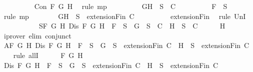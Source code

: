 \begin{isabellebody}
\ \ \ \ \ \ \ \ \isamarkupfalse%
\ {\isacartoucheopen}Con\ F\ G\ H{\isacartoucheclose}\ \isamarkupfalse%
\ {\isacharparenleft}rule\ mp{\isacharparenright}\isanewline
\ \ \ \ \ \ \isamarkupfalse%
\ \isamarkupfalse%
\ {\isachardoublequoteopen}{\isacharbraceleft}G{\isacharcomma}H{\isacharbraceright}\ {\isasymunion}\ S\ {\isasymin}\ C{\isachardoublequoteclose}\isanewline
\ \ \ \ \ \ \ \ \isamarkupfalse%
\ {\isacartoucheopen}F\ {\isasymin}\ S{\isacartoucheclose}\ \isamarkupfalse%
\ {\isacharparenleft}rule\ mp{\isacharparenright}\isanewline
\ \ \ \ \ \ \isamarkupfalse%
\ {\isachardoublequoteopen}{\isacharbraceleft}G{\isacharcomma}H{\isacharbraceright}\ {\isasymunion}\ S\ {\isasymin}\ {\isacharparenleft}extensionFin\ C{\isacharparenright}{\isachardoublequoteclose}\isanewline
\ \ \ \ \ \ \ \ \isamarkupfalse%
\ extensionFin\ \isamarkupfalse%
\ {\isacharparenleft}rule\ UnI{}{\isacharparenright}\isanewline
\ \ \ \ \isamarkupfalse%
\isanewline
\ \ \isamarkupfalse%
\isanewline
\ \ \isamarkupfalse%
\ S{}{\isacharcolon}{\isachardoublequoteopen}{\isasymforall}F\ G\ H{\isachardot}\ Dis\ F\ G\ H\ {\isasymlongrightarrow}\ F\ {\isasymin}\ S\ {\isasymlongrightarrow}\ {\isacharbraceleft}G{\isacharbraceright}\ {\isasymunion}\ S\ {\isasymin}\ C\ {\isasymor}\ {\isacharbraceleft}H{\isacharbraceright}\ {\isasymunion}\ S\ {\isasymin}\ C{\isachardoublequoteclose}\isanewline
\ \ \ \ \isamarkupfalse%
\ H\ \isamarkupfalse%
\ {\isacharparenleft}iprover\ elim{\isacharcolon}\ conjunct{}{\isacharparenright}\isanewline
\ \ \isamarkupfalse%
\ A{}{\isacharcolon}{\isachardoublequoteopen}{\isasymforall}F\ G\ H{\isachardot}\ Dis\ F\ G\ H\ {\isasymlongrightarrow}\ F\ {\isasymin}\ S\ {\isasymlongrightarrow}\ {\isacharbraceleft}G{\isacharbraceright}\ {\isasymunion}\ S\ {\isasymin}\ {\isacharparenleft}extensionFin\ C{\isacharparenright}\ {\isasymor}\ {\isacharbraceleft}H{\isacharbraceright}\ {\isasymunion}\ S\ {\isasymin}\ {\isacharparenleft}extensionFin\ C{\isacharparenright}{\isachardoublequoteclose}\isanewline
\ \ \isamarkupfalse%
\ {\isacharparenleft}rule\ allI{\isacharparenright}{\isacharplus}\isanewline
\ \ \ \ \isamarkupfalse%
\ F\ G\ H\isanewline
\ \ \ \ \isamarkupfalse%
\ {\isachardoublequoteopen}Dis\ F\ G\ H\ {\isasymlongrightarrow}\ F\ {\isasymin}\ S\ {\isasymlongrightarrow}\ {\isacharbraceleft}G{\isacharbraceright}\ {\isasymunion}\ S\ {\isasymin}\ {\isacharparenleft}extensionFin\ C{\isacharparenright}\ {\isasymor}\ {\isacharbraceleft}H{\isacharbraceright}\ {\isasymunion}\ S\ {\isasymin}\ {\isacharparenleft}extensionFin\ C{\isacharparenright}{\isachardoublequoteclose}\isanewline

\end{isabellebody}
